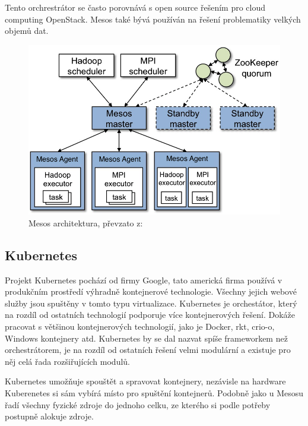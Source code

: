 Tento orchrestrátor se často porovnává s open source řešením pro cloud computing OpenStack. Mesos také bývá používán na řešení problematiky velkých objemů dat. 

\begin{figure}[H]
\begin{centering}
\includegraphics[width=1\textwidth]{img/mesos_arch}
\par\end{centering}
\caption{Mesos architektura, převzato z: \cite{mesos} \label{fig:mesos_arch}}
\end{figure}

\subsection{Kubernetes}
Projekt Kubernetes pochází od firmy Google, tato americká firma používá v produkčním prostředí výhradně kontejnerové technologie\cite{beda_prez}. Všechny jejich webové služby jsou spuštěny v tomto typu virtualizace. Kubernetes je orchestátor, který na rozdíl od ostatních technologií podporuje více kontejnerových řešení. Dokáže pracovat s většinou kontejnerových technologií, jako je Docker, rkt, crio-o, Windows kontejnery atd. Kubernetes by se dal nazvat spíše frameworkem než orchestrátorem, je na rozdíl od ostatních řešení velmi modulární a existuje pro něj celá řada rozšiřujících modulů\cite{k8s_kuba}. 

Kubernetes umožňuje spouštět a spravovat kontejnery, nezávisle na hardware Kuberenetes si sám vybírá místo pro spuštění kontejnerů. Podobně jako u Mesosu řadí všechny fyzické zdroje do jednoho celku, ze kterého si podle potřeby postupně alokuje zdroje. 

